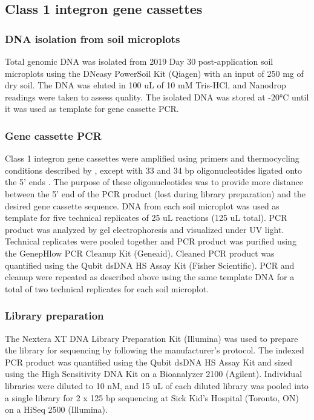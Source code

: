\subsection{Class 1 integron gene cassettes}

\subsubsection{DNA isolation from soil microplots}

Total genomic DNA was isolated from 2019 Day 30 post-application soil microplots using the DNeasy PowerSoil Kit (Qiagen) with an input of 250 mg of dry soil.
The DNA was eluted in 100 uL of 10 mM Tris-HCl, and Nanodrop readings were taken to assess quality.
The isolated DNA was stored at -20°C until it was used as template for gene cassette PCR.

\subsubsection{Gene cassette PCR}

Class 1 integron gene cassettes were amplified using primers and thermocycling conditions described by \textcite{stokesGeneCassettePCR2001}, except with 33 and 34 bp oligonucleotides ligated onto the 5’ ends \dummyfig.
The purpose of these oligonucleotides was to provide more distance between the 5’ end of the PCR product (lost during library preparation) and the desired gene cassette sequence.
DNA from each soil microplot was used as template for five technical replicates of 25 uL reactions (125 uL total).
PCR product was analyzed by gel electrophoresis and visualized under UV light.
Technical replicates were pooled together and PCR product was purified using the GenepHlow PCR Cleanup Kit (Geneaid).
Cleaned PCR product was quantified using the Qubit dsDNA HS Assay Kit (Fisher Scientific).
PCR and cleanup were repeated as described above using the same template DNA for a total of two technical replicates for each soil microplot.

\subsubsection{Library preparation}

The Nextera XT DNA Library Preparation Kit (Illumina) was used to prepare the library for sequencing by following the manufacturer’s protocol.
The indexed PCR product was quantified using the Qubit dsDNA HS Assay Kit and sized using the High Sensitivity DNA Kit on a Bioanalyzer 2100 (Agilent).
Individual libraries were diluted to 10 nM, and 15 uL of each diluted library was pooled into a single library for 2 x 125 bp sequencing at Sick Kid’s Hospital (Toronto, ON) on a HiSeq 2500 (Illumina).

